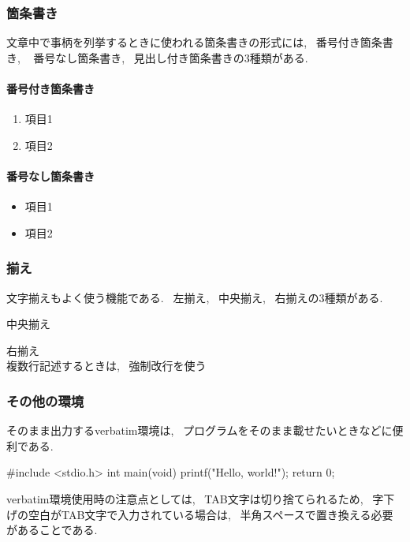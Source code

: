 \documentclass[titlepage]{jarticle}
\begin{document}
		\subsubsection{箇条書き}
			文章中で事柄を列挙するときに使われる箇条書きの形式には, ~番号付き箇条書き, ~ 番号なし箇条書き,
			~見出し付き箇条書きの3種類がある.

			\paragraph{番号付き箇条書き}
			\begin{enumerate}
				\item 項目1
				\item 項目2
			\end{enumerate}

			\paragraph{番号なし箇条書き}
			\begin{itemize}
				\item 項目1
				\item 項目2
			\end{itemize}

		\subsubsection{揃え}
			文字揃えもよく使う機能である. ~左揃え, ~中央揃え, ~右揃えの3種類がある.

			\begin{center}
				中央揃え
			\end{center}

			\begin{flushright}
				右揃え \\
				複数行記述するときは, ~強制改行を使う
			\end{flushright}

		\subsubsection{その他の環境}
			そのまま出力するverbatim環境は, ~プログラムをそのまま載せたいときなどに便利である.

			\begin{verbatim*}
				#include <stdio.h>
				int main(void) {
				  printf("Hello, world!\n");
				  return 0;
				}
			\end{verbatim*}

			verbatim環境使用時の注意点としては, ~TAB文字は切り捨てられるため,
			~字下げの空白がTAB文字で入力されている場合は, ~半角スペースで置き換える必要があることである.
\end{document}
